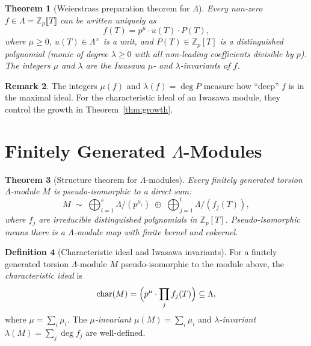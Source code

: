 \documentclass[12pt,a4paper]{amsart}
\newtheorem{theorem}{Theorem}[section]
\theoremstyle{definition}
\newtheorem{definition}[theorem]{Definition}
\newtheorem{remark}[theorem]{Remark}
\newcommand{\Zp}{\mathbb{Z}_p}
\begin{document}
\begin{theorem}[Weierstrass preparation theorem for $\Lambda$]
\label{thm:weierstrass_prep}
Every non-zero $f \in \Lambda = \Zp\llbracket T \rrbracket$ can be written uniquely as
\[
  f(T) = p^\mu \cdot u(T) \cdot P(T),
\]
where $\mu \ge 0$, $u(T) \in \Lambda^\times$ is a unit, and
$P(T) \in \Zp[T]$ is a \emph{distinguished polynomial} (monic of degree
$\lambda \ge 0$ with all non-leading coefficients divisible by $p$).
The integers $\mu$ and $\lambda$ are the \emph{Iwasawa $\mu$- and
$\lambda$-invariants} of $f$.
\end{theorem}

\begin{remark}
The integers $\mu(f)$ and $\lambda(f) = \deg P$ measure how ``deep''
$f$ is in the maximal ideal.  For the characteristic ideal of an Iwasawa
module, they control the growth in Theorem~\ref{thm:growth}.
\end{remark}

\section{Finitely Generated $\Lambda$-Modules}

\begin{theorem}[Structure theorem for $\Lambda$-modules]
\label{thm:structure}
Every finitely generated torsion $\Lambda$-module $M$ is pseudo-isomorphic
to a direct sum:
\[
  M \;\sim\; \bigoplus_{i=1}^s \Lambda/(p^{\mu_i}) \;\oplus\;
             \bigoplus_{j=1}^t \Lambda/(f_j(T)),
\]
where $f_j$ are irreducible distinguished polynomials in $\Zp[T]$.
\emph{Pseudo-isomorphic} means there is a $\Lambda$-module map with finite
kernel and cokernel.
\end{theorem}

\begin{definition}[Characteristic ideal and Iwasawa invariants]
\label{def:char_ideal}
For a finitely generated torsion $\Lambda$-module $M$ pseudo-isomorphic
to the module above, the \emph{characteristic ideal} is
\[
  \mathrm{char}(M) = \Bigl(p^{\mu} \cdot \prod_j f_j(T)\Bigr) \subseteq \Lambda,
\]
where $\mu = \sum_i \mu_i$.
The \emph{$\mu$-invariant} $\mu(M) = \sum_i \mu_i$ and
\emph{$\lambda$-invariant} $\lambda(M) = \sum_j \deg f_j$ are well-defined.
\end{definition}

\end{document}
